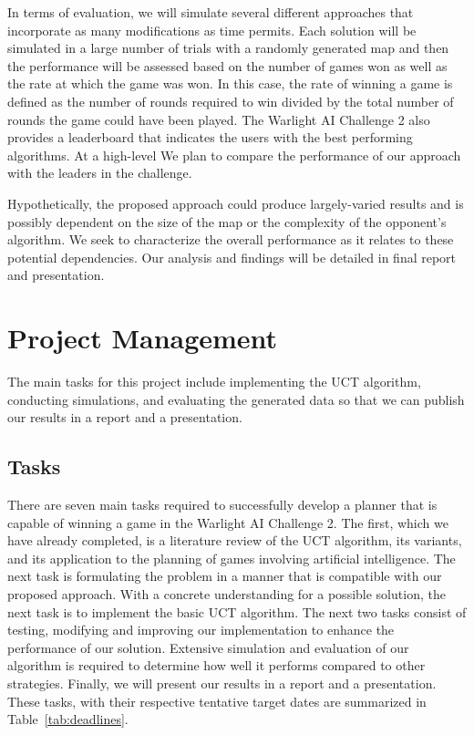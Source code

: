 \documentclass[a4paper,11pt]{article}
\begin{document}
In terms of evaluation, we will simulate several different approaches that incorporate as many modifications as time permits.  Each solution will be simulated in a large number of trials with a randomly generated map and then the performance will be assessed based on the number of games won as well as the rate at which the game was won.  In this case, the rate of winning a game is defined as the number of rounds required to win divided by the total number of rounds the game could have been played. The Warlight AI Challenge 2 also provides a leaderboard that indicates the users with the best performing algorithms. At a high-level We plan to compare the performance of our approach with the leaders in the challenge.

Hypothetically, the proposed approach could produce largely-varied results and is possibly dependent on the size of the map or the complexity of the opponent's algorithm. We seek to characterize the overall performance as it relates to these potential dependencies.  Our analysis and findings will be detailed in final report and presentation.



%
\section{Project Management}\label{sec:management}
The main tasks for this project include implementing the UCT algorithm, conducting simulations, and evaluating the generated data so that we can publish our results in a report and a presentation. 

\subsection{Tasks}\label{sec:tasks}
There are seven main tasks required to successfully develop a planner that is capable of winning a game in the Warlight AI Challenge 2.  The first, which we have already completed, is a literature review of the UCT algorithm, its variants, and its application to the planning of games involving artificial intelligence. The next task is formulating the problem in a manner that is compatible with our proposed approach. With a concrete understanding for a possible solution, the next task is to implement the basic UCT algorithm.  The next two tasks consist of testing, modifying and improving our implementation to enhance the performance of our solution.  Extensive simulation and evaluation of our algorithm is required to determine how well it performs compared to other strategies. Finally, we will present our results in a report and a presentation.  These tasks, with their respective tentative target dates are summarized in Table~\ref{tab:deadlines}.
\end{document}
